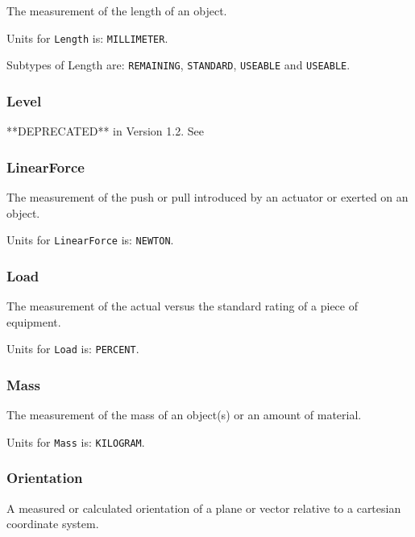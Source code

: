 The measurement of the length of an object.


Units for \texttt{Length} is: \texttt{MILLIMETER}.


Subtypes of Length are: \texttt{REMAINING}, \texttt{STANDARD}, \texttt{USEABLE} and \texttt{USEABLE}. 
\FloatBarrier

\subsubsection{Level}
  \label{sec:Level}


**DEPRECATED** in Version 1.2.  See 

\FloatBarrier

\subsubsection{LinearForce}
  \label{sec:LinearForce}


The measurement of the push or pull introduced by an actuator or exerted on an object.


Units for \texttt{LinearForce} is: \texttt{NEWTON}.

\FloatBarrier

\subsubsection{Load}
  \label{sec:Load}


The measurement of the actual versus the standard rating of a piece of equipment.


Units for \texttt{Load} is: \texttt{PERCENT}.

\FloatBarrier

\subsubsection{Mass}
  \label{sec:Mass}


The measurement of the mass of an object(s) or an amount of material.


Units for \texttt{Mass} is: \texttt{KILOGRAM}.

\FloatBarrier

\subsubsection{Orientation}
  \label{sec:Orientation}


A measured or calculated orientation of a plane or vector relative to a cartesian coordinate system.


